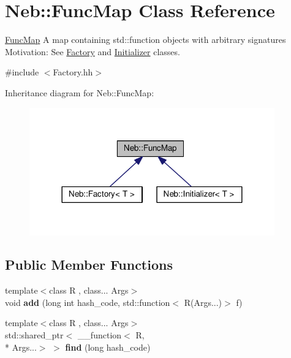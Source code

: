 \hypertarget{classNeb_1_1FuncMap}{\section{Neb\-:\-:Func\-Map Class Reference}
\label{classNeb_1_1FuncMap}
}


\hyperlink{classNeb_1_1FuncMap}{Func\-Map} A map containing {\ttfamily std\-::function} objects with arbitrary signatures Motivation\-: See \hyperlink{classNeb_1_1Factory}{Factory} and \hyperlink{classNeb_1_1Initializer}{Initializer} classes.  




{\ttfamily \#include $<$Factory.\-hh$>$}



Inheritance diagram for Neb\-:\-:Func\-Map\-:
\nopagebreak
\begin{figure}[H]
\begin{center}
\leavevmode
\includegraphics[width=300pt]{classNeb_1_1FuncMap__inherit__graph}
\end{center}
\end{figure}
\subsection*{Public Member Functions}
\begin{DoxyCompactItemize}
\item 
\hypertarget{classNeb_1_1FuncMap_aec4e7fa106d2843596ec782e310c60ab}{{\footnotesize template$<$class R , class... Args$>$ }\\void {\bfseries add} (long int hash\-\_\-code, std\-::function$<$ R(Args...)$>$ f)}\label{classNeb_1_1FuncMap_aec4e7fa106d2843596ec782e310c60ab}

\item 
\hypertarget{classNeb_1_1FuncMap_a77755854f1bac2503578c415c01dc0c3}{{\footnotesize template$<$class R , class... Args$>$ }\\std\-::shared\-\_\-ptr$<$ \-\_\-\-\_\-function$<$ R, \\*
Args...$>$ $>$ {\bfseries find} (long hash\-\_\-code)}\label{classNeb_1_1FuncMap_a77755854f1bac2503578c415c01dc0c3}

\end{DoxyCompactItemize}


